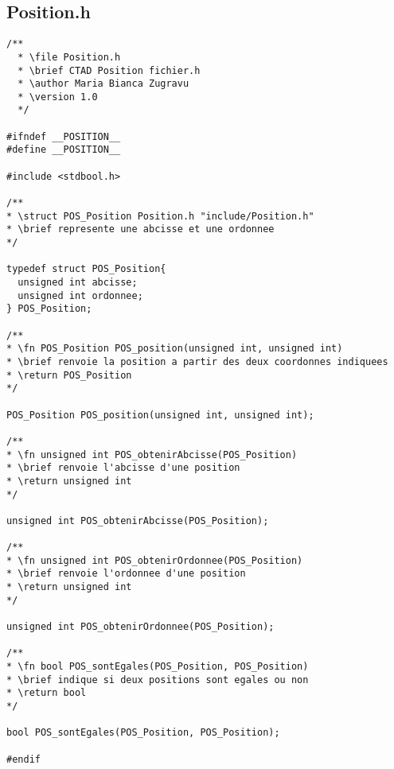 \subsection{Position.h}
\begin{lstlisting}
/**
  * \file Position.h
  * \brief CTAD Position fichier.h
  * \author Maria Bianca Zugravu
  * \version 1.0
  */

#ifndef __POSITION__
#define __POSITION__

#include <stdbool.h>

/**
* \struct POS_Position Position.h "include/Position.h"
* \brief represente une abcisse et une ordonnee
*/

typedef struct POS_Position{
  unsigned int abcisse;
  unsigned int ordonnee;
} POS_Position;

/**
* \fn POS_Position POS_position(unsigned int, unsigned int)
* \brief renvoie la position a partir des deux coordonnes indiquees
* \return POS_Position
*/

POS_Position POS_position(unsigned int, unsigned int);

/**
* \fn unsigned int POS_obtenirAbcisse(POS_Position)
* \brief renvoie l'abcisse d'une position
* \return unsigned int
*/

unsigned int POS_obtenirAbcisse(POS_Position);

/**
* \fn unsigned int POS_obtenirOrdonnee(POS_Position)
* \brief renvoie l'ordonnee d'une position
* \return unsigned int
*/

unsigned int POS_obtenirOrdonnee(POS_Position);

/**
* \fn bool POS_sontEgales(POS_Position, POS_Position)
* \brief indique si deux positions sont egales ou non
* \return bool
*/

bool POS_sontEgales(POS_Position, POS_Position);

#endif
\end{lstlisting}

